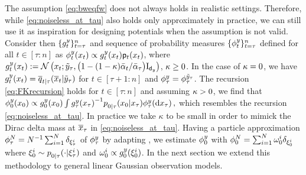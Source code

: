 The assumption \eqref{eq:bweqfw} does not always holds in realistic settings.%
Therefore, while \eqref{eq:noiseless_at_tau} also holds only approximately in practice, we can still use it as inspiration for designing potentials when the assumption is not valid.
Consider then $\{ \pot{t}{\lmeas}{} \}_{t = \tau} ^n$ and sequence of probability measures $\{ \filter{t}{\lmeas}{} \}_{t = \tau} ^n$ defined for all $t \in [\tau: n]$ as
$
    \filter{t}{\lmeas}{x_t} \propto \pot{t}{\lmeas}{\lstate_t} \bwmarg{t}{\lstate_t}$, where $\pot{t}{\lmeas}{\lstate_t }\eqdef\normpdf\left(\lstate_t; \tilde\lmeas_\tau, \big(1 - (1 - \inflationstd) \alphacumprod{t}{} / \alphacumprod{\tau}{} \big) \Id_{\dimorig}\right)$, $\kappa \geq 0$.
In the case of $\kappa = 0$, we have $\pot{t}{\lmeas}{\lstate_t} = \tfwtrans{t|\tau}{\tilde\lmeas_\tau}{\ltopstate_t}$ for $t \in [\tau + 1:n]$ and $\filter{\tau}{\lmeas}{} = \filter{\tau}{\tilde\lmeas_\tau}{}$. The recursion \eqref{eq:FKrecursion} holds for $t \in [\tau:n]$ and assuming $\kappa > 0$, we find that
$ 
    \filter{0}{\lmeas}{\lstate_0} \propto {\pot{0}{\lmeas}{\lstate_0}} \int {\pot{\tau}{\lmeas}{\lstate_\tau}}^{-1} \bwtrans{}{0|\tau}{\lstate_\tau}{\lstate_0} \filter{\tau}{\lmeas}{\rmd \lstate_\tau} \eqsp,
$
which resembles the recursion \eqref{eq:noiseless_at_tau}. In practice we take $\kappa$ to be small in order to mimick the Dirac delta mass at $\overline{x}_\tau$ in \eqref{eq:noiseless_at_tau}. Having a particle approximation $\filter{\tau}{N}{} = N^{-1} \sum_{i = 1}^N \delta_{\particle^i _\tau}$ of $\filter{\tau}{\lmeas}{}$ by adapting , we estimate $\filter{0}{\lmeas}{}$ with $
    \filter{0}{N}{} = \textstyle \sum_{i = 1}^N \weight{i}{0} \delta_{\particle^i _0}$ where $\particle^i _0 \sim \bwtrans{}{0|\tau}{\particle^i _\tau}{\cdot }$ and $\weight{i}{0} \propto \pot{0}{\lmeas}{\particle^i _0}$.
In the next section we extend this methodology to general linear Gaussian observation models.
